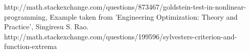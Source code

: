 \documentclass[12pt]{article}
\begin{document}
	
\begin{thebibliography}{99}
 http://math.stackexchange.com/questions/873467/goldstein-test-in-nonlinear-programming,
Example taken from 'Engineering Optimization: Theory and Practice', Singiresu S. Rao.
 http://math.stackexchange.com/questions/199596/sylvesters-criterion-and-function-extrema
\end{thebibliography}
	
	
\end{document}
